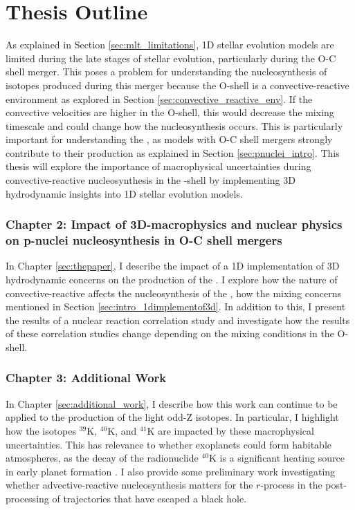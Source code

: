 \label{chapter:introduction}



%



\section{Thesis Outline}

As explained in Section \ref{sec:mlt_limitations}, 1D stellar evolution models are limited during the late stages of stellar evolution, particularly during the O-C shell merger.
This poses a problem for understanding the nucleosynthesis of isotopes produced during this merger because the O-shell is a convective-reactive environment as explored in Section \ref{sec:convective_reactive_env}.
If the convective velocities are higher in the O-shell, this would decrease the mixing timescale and could change how the nucleosynthesis occurs.
This is particularly important for understanding the \pnucn{}, as models with O-C shell mergers strongly contribute to their production as explained in Section \ref{sec:pnuclei_intro}.
This thesis will explore the importance of macrophysical uncertainties during convective-reactive nucleosynthesis in the \oxygen[]-shell by implementing 3D hydrodynamic insights into 1D stellar evolution models.

\subsubsection{Chapter 2: Impact of 3D-macrophysics and nuclear physics on p-nuclei nucleosynthesis in O-C shell mergers}

In Chapter \ref{sec:thepaper}, I describe the impact of a 1D implementation of 3D hydrodynamic concerns on the production of the \pnucn.
I explore how the nature of convective-reactive affects the nucleosynthesis of the \pnucn, how the mixing concerns mentioned in Section \ref{sec:intro_1dimplementof3d}.
In addition to this, I present the results of a nuclear reaction correlation study and investigate how the results of these correlation studies change depending on the mixing conditions in the O-shell.

\subsubsection{Chapter 3: Additional Work}
In Chapter \ref{sec:additional_work}, I describe how this work can continue to be applied to the production of the light odd-Z isotopes.
In particular, I highlight how the isotopes $^{39}\mathrm{K}$, $^{40}\mathrm{K}$, and $^{41}\mathrm{K}$ are impacted by these macrophysical uncertainties.
This has relevance to whether exoplanets could form habitable atmospheres, as the decay of the radionuclide $^{40}\mathrm{K}$ is a significant heating source in early planet formation \citep{frankRadiogenicHeatingEvolution2014,oneillEffectGalacticChemical2020}.
I also provide some preliminary work investigating whether advective-reactive nucleosynthesis matters for the $r$-process in the post-processing of trajectories that have escaped a black hole.
